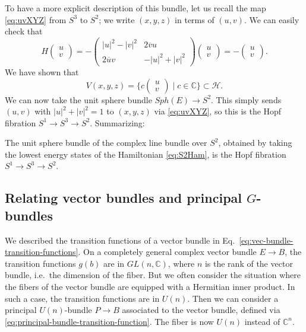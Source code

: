 \documentclass[12pt]{article}
\numberwithin{equation}{section}
\def\bC{\mathbb{C}}
\def\cH{\mathcal{H}}
\let\bar\overline
\begin{document}
To have a more explicit description of this bundle,
let us recall the map \eqref{eq:uvXYZ} from $S^3$ to $S^2$;
we write $(x,y,z)$ in terms of $(u,v)$.
We can easily check that 
\begin{equation}
H \begin{pmatrix}
u\\ v
\end{pmatrix}
=
- \begin{pmatrix}
|u|^2-|v|^2 & 2\bar v u \\
2 \bar u v & -|u|^2+|v|^2
\end{pmatrix}
\begin{pmatrix}
  u\\ v
  \end{pmatrix}
=
-\begin{pmatrix}
  u\\ v
\end{pmatrix}.
\end{equation}
We have shown that 
\begin{equation}
  V(x,y,z)= \{ c\begin{pmatrix}
    u\\ v
  \end{pmatrix}  \mid c\in \bC \} \subset \cH.
\end{equation} 
We can now take the unit sphere bundle $Sph(E)\to S^2$.
This simply sends $(u,v)$ with $|u|^2+|v|^2=1$ to $(x,y,z)$ via \eqref{eq:uvXYZ},
so this is the Hopf fibration $S^1\to S^3\to S^2$.
Summarizing:
\begin{example}
  \label{ex:S2parameterized}
  The unit sphere bundle 
  of the complex line bundle over $S^2$,
  obtained by taking the lowest energy states 
  of the Hamiltonian \eqref{eq:S2Ham},
  is the Hopf fibration $S^1\to S^3\to S^2$.
\end{example}

\subsection{Relating vector bundles and principal $G$-bundles}

We described the transition functions of a vector bundle in Eq.~\eqref{eq:vec-bundle-transition-functions}.
On a completely general complex vector bundle $E\to B$,
the transition functions $g (b)$ are in $GL(n,\bC)$,
where $n$ is the rank of the vector bundle, i.e.~the dimension of the fiber. 
But we often consider the situation where the fibers of the vector bundle are equipped with a Hermitian inner product.
In such a case, the transition functions are in $U(n)$.
Then we can consider a principal $U(n)$-bundle $P\to B$ associated to the vector bundle, 
defined via \eqref{eq:principal-bundle-transition-function}.
The fiber is now $U(n)$ instead of $\bC^n$.
\end{document}
